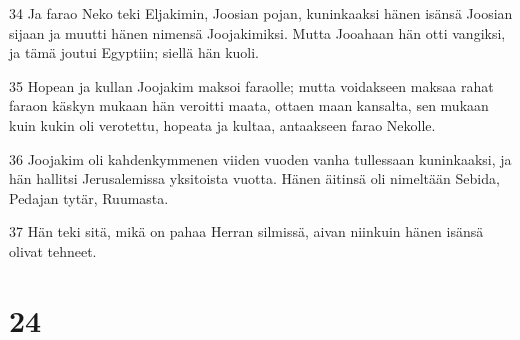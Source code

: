 \par 34 Ja farao Neko teki Eljakimin, Joosian pojan, kuninkaaksi hänen isänsä Joosian sijaan ja muutti hänen nimensä Joojakimiksi. Mutta Jooahaan hän otti vangiksi, ja tämä joutui Egyptiin; siellä hän kuoli.
\par 35 Hopean ja kullan Joojakim maksoi faraolle; mutta voidakseen maksaa rahat faraon käskyn mukaan hän veroitti maata, ottaen maan kansalta, sen mukaan kuin kukin oli verotettu, hopeata ja kultaa, antaakseen farao Nekolle.
\par 36 Joojakim oli kahdenkymmenen viiden vuoden vanha tullessaan kuninkaaksi, ja hän hallitsi Jerusalemissa yksitoista vuotta. Hänen äitinsä oli nimeltään Sebida, Pedajan tytär, Ruumasta.
\par 37 Hän teki sitä, mikä on pahaa Herran silmissä, aivan niinkuin hänen isänsä olivat tehneet.

\chapter{24}


